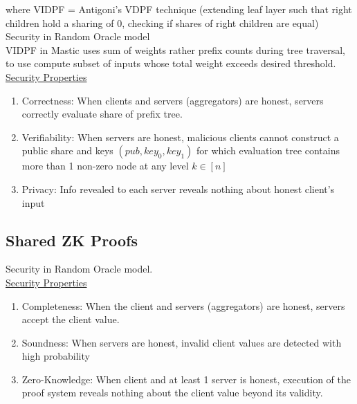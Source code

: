 where VIDPF = Antigoni's VDPF technique (extending leaf layer such that right children hold a sharing of 0, checking if shares of right children are equal) \\

Security in Random Oracle model \\

VIDPF in Mastic uses sum of weights rather prefix counts during tree traversal, to use compute subset of inputs whose total weight exceeds desired threshold. \\

\underline{Security Properties}
\begin{enumerate}
    \item Correctness: When clients and servers (aggregators) are honest, servers correctly evaluate share of prefix tree.
    \item Verifiability: When servers are honest, malicious clients cannot construct a public share and keys $(pub, key_0, key_1)$ for which evaluation tree contains more than 1 non-zero node at any level $k \in [n]$
    \item Privacy: Info revealed to each server reveals nothing about honest client's input
\end{enumerate}

\subsection{Shared ZK Proofs}
Security in Random Oracle model. \\

\underline{Security Properties}
\begin{enumerate}
    \item Completeness: When the client and servers (aggregators) are honest, servers accept the client value. 
    \item Soundness: When servers are honest, invalid client values are detected with high probability
    \item Zero-Knowledge: When client and at least 1 server is honest, execution of the proof system reveals nothing about the client value beyond its validity.
\end{enumerate}




%
